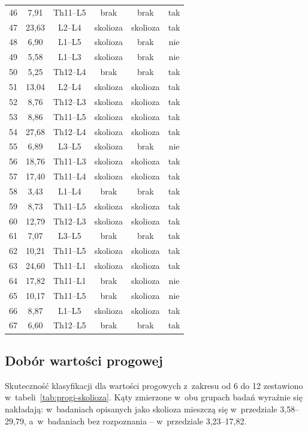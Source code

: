 \begin{longtable}{cccccc}
    46 & 7,91 & Th11--L5 & brak & brak & tak \\
    47 & 23,63 & L2--L4 & skolioza & skolioza & tak \\
    48 & 6,90 & L1--L5 & skolioza & brak & nie \\
    49 & 5,58 & L1--L3 & skolioza & brak & nie \\
    50 & 5,25 & Th12--L4 & brak & brak & tak \\
    51 & 13,04 & L2--L4 & skolioza & skolioza & tak \\
    52 & 8,76 & Th12--L3 & skolioza & skolioza & tak \\
    53 & 8,86 & Th11--L5 & skolioza & skolioza & tak \\
    54 & 27,68 & Th12--L4 & skolioza & skolioza & tak \\
    55 & 6,89 & L3--L5 & skolioza & brak & nie \\
    56 & 18,76 & Th11--L3 & skolioza & skolioza & tak \\
    57 & 17,40 & Th11--L4 & skolioza & skolioza & tak \\
    58 & 3,43 & L1--L4 & brak & brak & tak \\
    59 & 8,73 & Th11--L5 & skolioza & skolioza & tak \\
    60 & 12,79 & Th12--L3 & skolioza & skolioza & tak \\
    61 & 7,07 & L3--L5 & brak & brak & tak \\
    62 & 10,21 & Th11--L5 & skolioza & skolioza & tak \\
    63 & 24,60 & Th11--L1 & skolioza & skolioza & tak \\
    64 & 17,82 & Th11--L1 & brak & skolioza & nie \\
    65 & 10,17 & Th11--L5 & brak & skolioza & nie \\
    66 & 8,87 & L1--L5 & skolioza & skolioza & tak \\
    67 & 6,60 & Th12--L5 & brak & brak & tak \\
\end{longtable}
\endgroup

\subsection{Dobór wartości progowej}
\label{subsec:prog-skolioza}

Skuteczność klasyfikacji dla wartości progowych z~zakresu od 6\degree{} do 12\degree{} zestawiono w~tabeli~\ref{tab:progi-skolioza}.
Kąty zmierzone w~obu grupach badań wyraźnie się nakładają: w~badaniach opisanych jako skolioza mieszczą się w~przedziale 3,58--29,79\degree{}, a~w~badaniach bez rozpoznania -- w~przedziale 3,23--17,82\degree{}.

